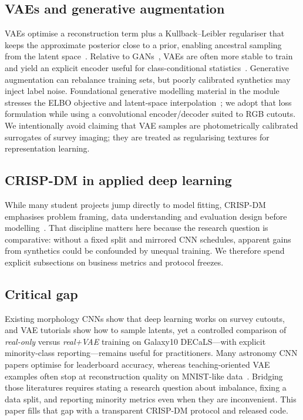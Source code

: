 \documentclass[conference]{IEEEtran}
\begin{document}
\subsection{VAEs and generative augmentation}
VAEs optimise a reconstruction term plus a Kullback--Leibler regulariser that keeps the approximate posterior close to a prior, enabling ancestral sampling from the latent space~\cite{kingma2014auto,zhang2023dive}. Relative to GANs~\cite{goodfellow2014gan}, VAEs are often more stable to train and yield an explicit encoder useful for class-conditional statistics~\cite{aggarwal2018neural}. Generative augmentation can rebalance training sets, but poorly calibrated synthetics may inject label noise. Foundational generative modelling material in the module stresses the ELBO objective and latent-space interpolation~\cite{zhang2023dive}; we adopt that loss formulation while using a convolutional encoder/decoder suited to RGB cutouts. We intentionally avoid claiming that VAE samples are photometrically calibrated surrogates of survey imaging; they are treated as regularising textures for representation learning.

\subsection{CRISP-DM in applied deep learning}
While many student projects jump directly to model fitting, CRISP-DM emphasises problem framing, data understanding and evaluation design before modelling~\cite{chapman2000crisp}. That discipline matters here because the research question is comparative: without a fixed split and mirrored CNN schedules, apparent gains from synthetics could be confounded by unequal training. We therefore spend explicit subsections on business metrics and protocol freezes.

\subsection{Critical gap}
Existing morphology CNNs show that deep learning works on survey cutouts, and VAE tutorials show how to sample latents, yet a controlled comparison of \emph{real-only} versus \emph{real+VAE} training on Galaxy10 DECaLS---with explicit minority-class reporting---remains useful for practitioners. Many astronomy CNN papers optimise for leaderboard accuracy, whereas teaching-oriented VAE examples often stop at reconstruction quality on MNIST-like data~\cite{zhang2023dive}. Bridging those literatures requires stating a research question about imbalance, fixing a data split, and reporting minority metrics even when they are inconvenient. This paper fills that gap with a transparent CRISP-DM protocol and released code.
\end{document}
